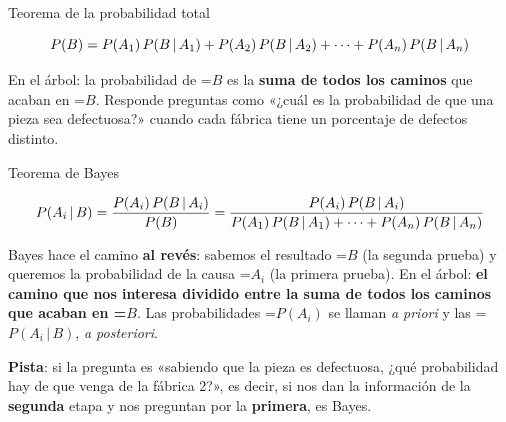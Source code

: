 \documentclass[11pt,a4paper]{article}
\newcommand{\fmm}[1]{\setbox0=\hbox{$#1$}\ifdim\wd0>\linewidth\fmdisp{#1}\else\mbox{\box0}\fi}
\newcommand{\fmdisp}[1]{\[\setbox2=\hbox{$\displaystyle #1$}\ifdim\wd2>\linewidth\resizebox{\linewidth}{!}{\box2}\else\box2\fi\]}
\newcommand{\fmuline}[1]{\textbf{\color{fmaccent}#1}}
\begin{document}
\begin{fmprop}{Teorema de la probabilidad total}

\fmdisp{P(B)=P(A_1)\,P(B\,|\,A_1)+P(A_2)\,P(B\,|\,A_2)+\dots+P(A_n)\,P(B\,|\,A_n)}

En el árbol: la probabilidad de \fmm{B} es la \textbf{suma de todos los caminos} que acaban en \fmm{B}. Responde preguntas como «¿cuál es la probabilidad de que una pieza sea defectuosa?» cuando cada fábrica tiene un porcentaje de defectos distinto.
\end{fmprop}

\begin{fmprop}{Teorema de Bayes}

\fmdisp{P(A_i\,|\,B)=\frac{P(A_i)\,P(B\,|\,A_i)}{P(B)}=\frac{P(A_i)\,P(B\,|\,A_i)}{P(A_1)\,P(B\,|\,A_1)+\dots+P(A_n)\,P(B\,|\,A_n)}}

Bayes hace el camino \textbf{al revés}: sabemos el resultado \fmm{B} (la segunda prueba) y queremos la probabilidad de la causa \fmm{A_i} (la primera prueba). En el árbol: \textbf{el camino que nos interesa dividido entre la suma de todos los caminos que acaban en \fmm{B}}. Las probabilidades \fmm{P(A_i)} se llaman \emph{a priori} y las \fmm{P(A_i\,|\,B)}, \emph{a posteriori}.

\begin{fmnote}\fmuline{Pista}: si la pregunta es «sabiendo que la pieza es defectuosa, ¿qué probabilidad hay de que venga de la fábrica 2?», es decir, si nos dan la información de la \textbf{segunda} etapa y nos preguntan por la \textbf{primera}, es Bayes.\end{fmnote}
\end{fmprop}
\end{document}

